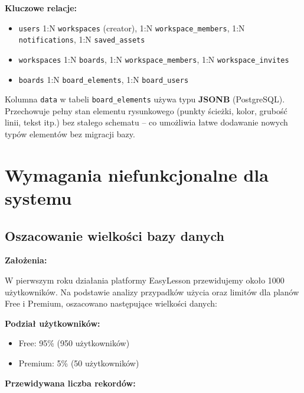 \documentclass[12pt,a4paper]{article}
\begin{document}
\textbf{Kluczowe relacje:}
\begin{itemize}[leftmargin=*]
    \item \texttt{users} 1:N \texttt{workspaces} (creator), 1:N \texttt{workspace\_members}, 1:N \texttt{notifications}, 1:N \texttt{saved\_assets}
    \item \texttt{workspaces} 1:N \texttt{boards}, 1:N \texttt{workspace\_members}, 1:N \texttt{workspace\_invites}
    \item \texttt{boards} 1:N \texttt{board\_elements}, 1:N \texttt{board\_users}
\end{itemize}

\begin{tcolorbox}[colback=blue!5!white,colframe=blue!75!black,title=\faInfoCircle\ JSONB w board\_elements]
Kolumna \texttt{data} w tabeli \texttt{board\_elements} używa typu \textbf{JSONB} (PostgreSQL). Przechowuje pełny stan elementu rysunkowego (punkty ścieżki, kolor, grubość linii, tekst itp.) bez stałego schematu -- co umożliwia łatwe dodawanie nowych typów elementów bez migracji bazy.
\end{tcolorbox}

\section{Wymagania niefunkcjonalne dla systemu}

\subsection{Oszacowanie wielkości bazy danych}

\textbf{Założenia:}

W pierwszym roku działania platformy EasyLesson przewidujemy około 1000 użytkowników. Na podstawie analizy przypadków użycia oraz limitów dla planów Free i Premium, oszacowano następujące wielkości danych:

\textbf{Podział użytkowników:}
\begin{itemize}[leftmargin=*]
    \item Free: 95\% (950 użytkowników)
    \item Premium: 5\% (50 użytkowników)
\end{itemize}

\textbf{Przewidywana liczba rekordów:}
\end{document}
